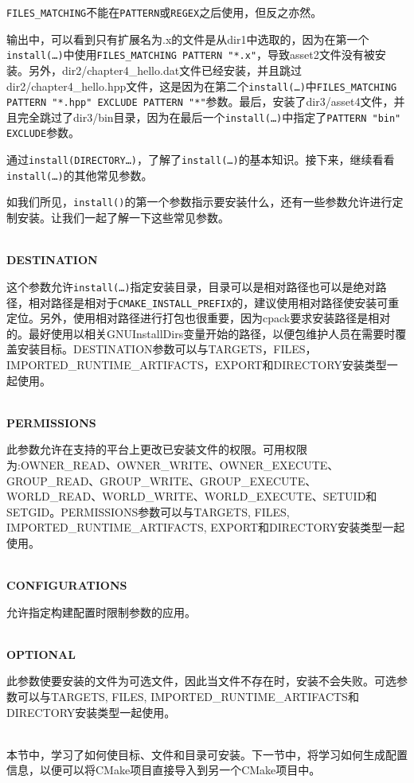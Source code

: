 \begin{tcolorbox}[colback=webgreen!5!white,colframe=webgreen!75!black,title=Note]
\texttt{FILES\_MATCHING}不能在\texttt{PATTERN}或\texttt{REGEX}之后使用，但反之亦然。
\end{tcolorbox}

输出中，可以看到只有扩展名为.x的文件是从dir1中选取的，因为在第一个\texttt{install(…)}中使用\texttt{FILES\_MATCHING PATTERN "*.x"}，导致asset2文件没有被安装。另外，dir2/chapter4\_hello.dat文件已经安装，并且跳过dir2/chapter4\_hello.hpp文件，这是因为在第二个\texttt{install(…)}中\texttt{FILES\_MATCHING PATTERN "*.hpp" EXCLUDE PATTERN "*"}参数。最后，安装了dir3/asset4文件，并且完全跳过了dir3/bin目录，因为在最后一个\texttt{install(…)}中指定了\texttt{PATTERN "bin" EXCLUDE}参数。

通过\texttt{install(DIRECTORY…)}，了解了\texttt{install(…)}的基本知识。接下来，继续看看\texttt{install(…)}的其他常见参数。


如我们所见，\texttt{install()}的第一个参数指示要安装什么，还有一些参数允许进行定制安装。让我们一起了解一下这些常见参数。

\hspace*{\fill} \\ %
\noindent
\textbf{DESTINATION}

这个参数允许\texttt{install(…)}指定安装目录，目录可以是相对路径也可以是绝对路径，相对路径是相对于\texttt{CMAKE\_INSTALL\_PREFIX}的，建议使用相对路径使安装可重定位。另外，使用相对路径进行打包也很重要，因为cpack要求安装路径是相对的。最好使用以相关GNUInstallDirs变量开始的路径，以便包维护人员在需要时覆盖安装目标。DESTINATION参数可以与TARGETS，FILES，IMPORTED\_RUNTIME\_ARTIFACTS，EXPORT和DIRECTORY安装类型一起使用。

\hspace*{\fill} \\ %
\noindent
\textbf{PERMISSIONS}

此参数允许在支持的平台上更改已安装文件的权限。可用权限为:OWNER\_READ、OWNER\_WRITE、OWNER\_EXECUTE、GROUP\_READ、GROUP\_WRITE、GROUP\_EXECUTE、WORLD\_READ、WORLD\_WRITE、WORLD\_EXECUTE、SETUID和SETGID。PERMISSIONS参数可以与TARGETS, FILES, IMPORTED\_RUNTIME\_ARTIFACTS, EXPORT和DIRECTORY安装类型一起使用。

\hspace*{\fill} \\ %
\noindent
\textbf{CONFIGURATIONS}

允许指定构建配置时限制参数的应用。

\hspace*{\fill} \\ %
\noindent
\textbf{OPTIONAL}

此参数使要安装的文件为可选文件，因此当文件不存在时，安装不会失败。可选参数可以与TARGETS, FILES, IMPORTED\_RUNTIME\_ARTIFACTS和DIRECTORY安装类型一起使用。

\hspace*{\fill} \\ %
本节中，学习了如何使目标、文件和目录可安装。下一节中，将学习如何生成配置信息，以便可以将CMake项目直接导入到另一个CMake项目中。











